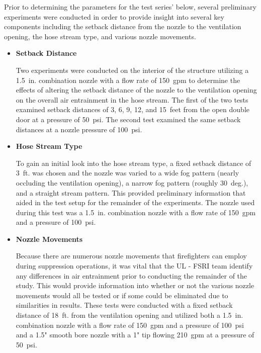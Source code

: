 \documentclass{article}
\begin{document}
Prior to determining the parameters for the test series' below, several preliminary experiments were conducted in order to provide insight into several key components including the setback distance from the nozzle to the ventilation opening, the hose stream type, and various nozzle movements.

\begin{itemize}

\item \bf{Setback Distance}
\normalfont
\vspace*{\baselineskip}

Two experiments were conducted on the interior of the structure utilizing a 1.5~in. combination nozzle with a flow rate of 150~gpm to determine the effects of altering the setback distance of the nozzle to the ventilation opening on the overall air entrainment in the hose stream. The first of the two tests examined setback distances of 3, 6, 9, 12, and 15~feet from the open double door at a pressure of 50~psi. The second test examined the same setback distances at a nozzle pressure of 100~psi.  

\vspace*{\baselineskip}

\item \bf{Hose Stream Type}
\normalfont
\vspace*{\baselineskip}

To gain an initial look into the hose stream type, a fixed setback distance of 3~ft. was chosen and the nozzle was varied to a wide fog pattern (nearly occluding the ventilation opening), a narrow fog pattern (roughly 30~deg.), and a straight stream pattern. This provided preliminary information that aided in the test setup for the remainder of the experiments. The nozzle used during this test was a 1.5~in. combination nozzle with a flow rate of 150~gpm and a pressure of 100~psi.

\vspace*{\baselineskip}

\item \bf{Nozzle Movements}
\normalfont
\vspace*{\baselineskip}

Because there are numerous nozzle movements that firefighters can employ during suppression operations, it was vital that the UL - FSRI team identify any differences in air entrainment prior to conducting the remainder of the study. This would provide information into whether or not the various nozzle movements would all be tested or if some could be eliminated due to similarities in results. These tests were conducted with a fixed setback distance of 18~ft. from the ventilation opening and utilized both a 1.5~in. combination nozzle with a flow rate of 150~gpm and a pressure of 100~psi and a 1.5" smooth bore nozzle with a 1" tip flowing 210~gpm at a pressure of 50~psi.


\end{itemize}
\end{document}
